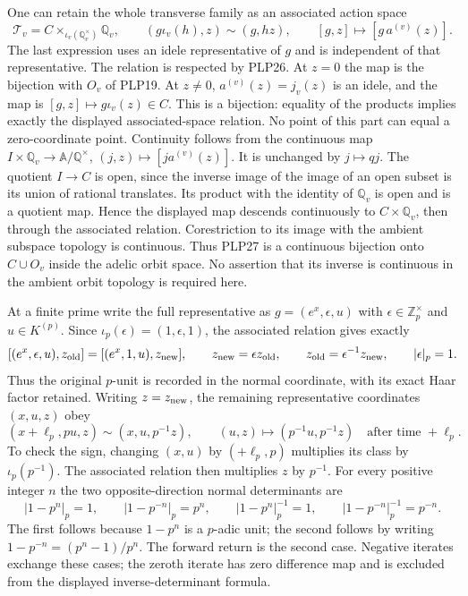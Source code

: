 One can retain the whole transverse family as an associated
action space
\begin{equation}\tag{PLP27}
\mathcal T_v=
C\times_{\iota_v(\mathbb Q_v^\times)}\mathbb Q_v,\qquad
(g\iota_v(h),z)\sim(g,hz),\qquad
[g,z]\longmapsto[g\,a^{(v)}(z)] .
\end{equation}
The last expression uses an idele representative of $g$ and is
independent of that representative. The relation is respected by
PLP26. At $z=0$ the map is the bijection with $O_v$ of PLP19.
At $z\ne0$, $a^{(v)}(z)=j_v(z)$ is an idele, and the map is
$[g,z]\mapsto g\iota_v(z)\in C$. This is a bijection: equality
of the products implies exactly the displayed associated-space
relation. No point of this part can equal a zero-coordinate
point. Continuity follows from the continuous map
$I\times\mathbb Q_v\to\mathbb A/\mathbb Q^\times$,
$(j,z)\mapsto[j a^{(v)}(z)]$. It is unchanged by $j\mapsto qj$.
The quotient $I\to C$ is open, since the inverse image of the
image of an open subset is its union of rational translates.
Its product with the identity of $\mathbb Q_v$ is open and is
a quotient map. Hence the displayed map descends continuously
to $C\times\mathbb Q_v$, then through the associated relation.
Corestriction to its image with the ambient subspace topology
is continuous. Thus PLP27 is a continuous bijection onto
$C\cup O_v$ inside the adelic orbit space. No assertion that
its inverse is continuous in the ambient orbit topology is
required here.

At a finite prime write the full representative as
$g=(e^x,\epsilon,u)$ with $\epsilon\in\mathbb Z_p^\times$ and
$u\in K^{(p)}$. Since $\iota_p(\epsilon)=(1,\epsilon,1)$,
the associated relation gives exactly
\[
 [(e^x,\epsilon,u),z_{\rm old}]
 =[(e^x,1,u),z_{\rm new}],\qquad
 z_{\rm new}=\epsilon z_{\rm old},\qquad
 z_{\rm old}=\epsilon^{-1}z_{\rm new},\qquad
 |\epsilon|_p=1 .
\]
Thus the original $p$-unit is recorded in the normal coordinate,
with its exact Haar factor retained. Writing $z=z_{\rm new}$,
the remaining representative coordinates $(x,u,z)$ obey
\begin{equation}\tag{PLP28}
(x+\ell_p,pu,z)\sim(x,u,p^{-1}z),\qquad
(u,z)\longmapsto(p^{-1}u,p^{-1}z)
\quad\text{after time }+\ell_p .
\end{equation}
To check the sign, changing $(x,u)$ by
$(+\ell_p,p)$ multiplies its class by $\iota_p(p^{-1})$.
The associated relation then multiplies $z$ by $p^{-1}$.
For every positive integer $n$ the two opposite-direction
normal determinants are
\begin{equation}\tag{PLP29}
|1-p^n|_p=1,\qquad |1-p^{-n}|_p=p^n,\qquad
|1-p^n|_p^{-1}=1,\qquad |1-p^{-n}|_p^{-1}=p^{-n}.
\end{equation}
The first follows because $1-p^n$ is a $p$-adic unit; the
second follows by writing $1-p^{-n}=(p^n-1)/p^n$.
The forward return is the second case. Negative iterates exchange
these cases; the zeroth iterate has zero difference map and is
excluded from the displayed inverse-determinant formula.


